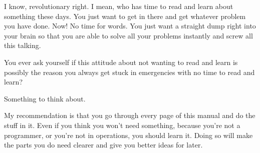 I know, revolutionary right.  I mean, who has time to read and learn about something
these days.  You just want to get in there and get whatever problem you have done.
Now! No time for words.  You just want a straight dump right into your brain so
that you are able to solve all your problems instantly and screw all this talking.

You ever ask yourself if this attitude about not wanting to read and learn is 
possibly the reason you always get stuck in emergencies with no time to read
and learn?

Something to think about.

My recommendation is that you go through every page of this manual and do the 
stuff in it.  Even if you think you won't need something, because you're not
a programmer, or you're not in operations, you should learn it.  Doing so will
make the parts you do need clearer and give you better ideas for later.


